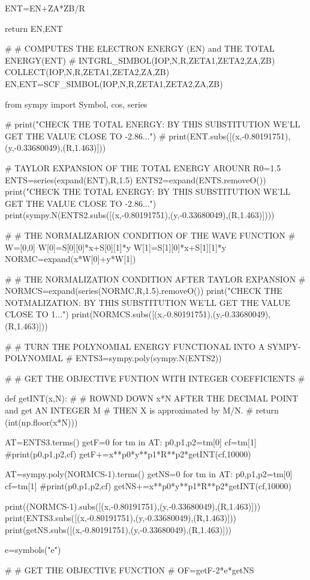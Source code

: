     ENT=EN+ZA*ZB/R

    return EN,ENT

#
# COMPUTES THE ELECTRON ENERGY (EN) and THE TOTAL ENERGY(ENT)
#
INTGRL_SIMBOL(IOP,N,R,ZETA1,ZETA2,ZA,ZB)
COLLECT(IOP,N,R,ZETA1,ZETA2,ZA,ZB)
EN,ENT=SCF_SIMBOL(IOP,N,R,ZETA1,ZETA2,ZA,ZB)

from sympy import Symbol, cos, series

#
print("CHECK THE TOTAL ENERGY: BY THIS SUBSTITUTION WE'LL GET THE VALUE CLOSE TO -2.86...")
#
print(ENT.subs([(x,-0.80191751),(y,-0.33680049),(R,1.463)]))

# TAYLOR EXPANSION OF THE TOTAL ENERGY AROUNR R0=1.5
ENTS=series(expand(ENT),R,1.5)
ENTS2=expand(ENTS.removeO())
print("CHECK THE TOTAL ENERGY: BY THIS SUBSTITUTION WE'LL GET THE VALUE CLOSE TO -2.86...")
print(sympy.N(ENTS2.subs([(x,-0.80191751),(y,-0.33680049),(R,1.463)])))

#
# THE NORMALIZARION CONDITION OF THE WAVE FUNCTION
#
W=[0,0]
W[0]=S[0][0]*x+S[0][1]*y
W[1]=S[1][0]*x+S[1][1]*y
NORMC=expand(x*W[0]+y*W[1])

#
# THE NORMALIZATION CONDITION AFTER TAYLOR EXPANSION
#
NORMCS=expand(series(NORMC,R,1.5).removeO())
print("CHECK THE NOTMALIZATION: BY THIS SUBSTITUTION WE'LL GET THE VALUE CLOSE TO 1...")
print(NORMCS.subs([(x,-0.80191751),(y,-0.33680049),(R,1.463)]))

#
# TURN THE POLYNOMIAL ENERGY FUNCTIONAL INTO A SYMPY-POLYNOMIAL
#
ENTS3=sympy.poly(sympy.N(ENTS2))

#
# GET THE OBJECTIVE FUNTION WITH INTEGER COEFFICIENTS
#

def getINT(x,N):
#
#  ROWND DOWN x*N AFTER THE DECIMAL POINT and get AN INTEGER M
#  THEN X is approximated by M/N. 
#
    return (int(np.floor(x*N)))

AT=ENTS3.terms()
getF=0
for tm in AT:
    p0,p1,p2=tm[0]
    cf=tm[1]
    #print(p0,p1,p2,cf)
    getF+=x**p0*y**p1*R**p2*getINT(cf,10000)

AT=sympy.poly(NORMCS-1).terms()
getNS=0
for tm in AT:
    p0,p1,p2=tm[0]
    cf=tm[1]
    #print(p0,p1,p2,cf)
    getNS+=x**p0*y**p1*R**p2*getINT(cf,10000)

print((NORMCS-1).subs([(x,-0.80191751),(y,-0.33680049),(R,1.463)]))
print(ENTS3.subs([(x,-0.80191751),(y,-0.33680049),(R,1.463)]))
print(getNS.subs([(x,-0.80191751),(y,-0.33680049),(R,1.463)]))

e=symbols("e")

#
# GET THE OBJECTIVE FUNCTION
#
OF=getF-2*e*getNS

